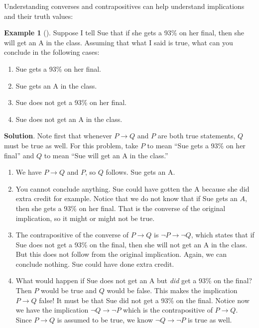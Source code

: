\documentclass[10pt,]{book}
\theoremstyle{plain}
\theoremstyle{definition}
\theoremstyle{definition}
\newtheorem{example}[theorem]{Example}
\theoremstyle{definition}
\theoremstyle{definition}
\numberwithin{equation}{chapter}
\def\imp{\rightarrow}
\begin{document}
\hypertarget{p-1305}{}%
Understanding converses and contrapositives can help understand implications and their truth values:%
\begin{example}[]\label{example-35}
\hypertarget{p-1306}{}%
Suppose I tell Sue that if she gets a 93\% on her final, then she will get an A in the class. Assuming that what I said is true, what can you conclude in the following cases:%
\par
\hypertarget{p-1307}{}%
\leavevmode%
\begin{enumerate}
\item\hypertarget{li-297}{}\hypertarget{p-1308}{}%
Sue gets a 93\% on her final.%
\item\hypertarget{li-298}{}\hypertarget{p-1309}{}%
Sue gets an A in the class.%
\item\hypertarget{li-299}{}\hypertarget{p-1310}{}%
Sue does not get a 93\% on her final.%
\item\hypertarget{li-300}{}\hypertarget{p-1311}{}%
Sue does not get an A in the class.%
\end{enumerate}
%
\par\smallskip%
\noindent\textbf{Solution}.\hypertarget{solution-120}{}\quad%
\hypertarget{p-1312}{}%
Note first that whenever \(P \imp Q\) and \(P\) are both true statements, \(Q\) must be true as well. For this problem, take \(P\) to mean ``Sue gets a 93\% on her final'' and \(Q\) to mean ``Sue will get an A in the class.''%
\par
\hypertarget{p-1313}{}%
\leavevmode%
\begin{enumerate}
\item\hypertarget{li-301}{}\hypertarget{p-1314}{}%
We have \(P \imp Q\) and \(P\), so \(Q\) follows. Sue gets an A.%
\item\hypertarget{li-302}{}\hypertarget{p-1315}{}%
You cannot conclude anything. Sue could have gotten the A because she did extra credit for example. Notice that we do not know that if Sue gets an \(A\), then she gets a 93\% on her final. That is the converse of the original implication, so it might or might not be true.%
\item\hypertarget{li-303}{}\hypertarget{p-1316}{}%
The contrapositive of the converse of \(P \imp Q\) is \(\neg P \imp \neg Q\), which states that if Sue does not get a 93\% on the final, then she will not get an A in the class. But this does not follow from the original implication. Again, we can conclude nothing. Sue could have done extra credit.%
\item\hypertarget{li-304}{}\hypertarget{p-1317}{}%
What would happen if Sue does not get an A but \emph{did} get a 93\% on the final? Then \(P\) would be true and \(Q\) would be false. This makes the implication \(P \imp Q\) false! It must be that Sue did not get a 93\% on the final. Notice now we have the implication \(\neg Q \imp \neg P\) which is the contrapositive of \(P \imp Q\). Since \(P \imp Q\) is assumed to be true, we know \(\neg Q \imp \neg P\) is true as well.%
\end{enumerate}
%
\end{example}
\end{document}
